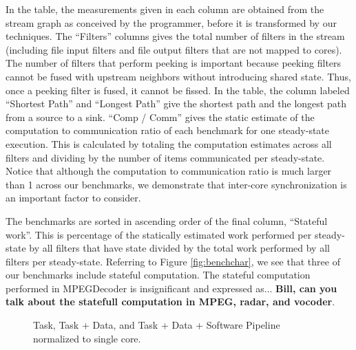 In the table, the measurements given in each column are obtained from
the stream graph as conceived by the programmer, before it is
transformed by our techniques.  The ``Filters'' columns gives the
total number of filters in the stream (including file input filters
and file output filters that are not mapped to cores).  The number of
filters that perform peeking is important because peeking filters
cannot be fused with upstream neighbors without introducing shared
state.  Thus, once a peeking filter is fused, it cannot be fissed. In
the table, the column labeled ``Shortest Path'' and ``Longest Path''
give the shortest path and the longest path from a source to a
sink. ``Comp / Comm'' gives the static estimate of the computation to
communication ratio of each benchmark for one steady-state
execution. This is calculated by totaling the computation estimates
across all filters and dividing by the number of items communicated
per steady-state. Notice that although the computation to
communication ratio is much larger than 1 across our benchmarks, we
demonstrate that inter-core synchronization is an important factor to
consider.

The benchmarks are sorted in ascending order of the final column,
``Stateful work''. This is percentage of the statically estimated work
performed per steady-state by all filters that have state divided by
the total work performed by all filters per steady-state.  Referring
to Figure \ref{fig:benchchar}, we see that three of our benchmarks
include stateful computation.  The stateful computation performed in
MPEGDecoder is insignificant and expressed as...
\textbf{Bill, can you talk about the statefull computation in
MPEG, radar, and vocoder}.


\begin{figure*}[t]
\centering
{}
\caption{Task, Task + Data, and Task + Data + Software Pipeline
normalized to single core.
\protect\label{fig:main_comp}}
\end{figure*}

